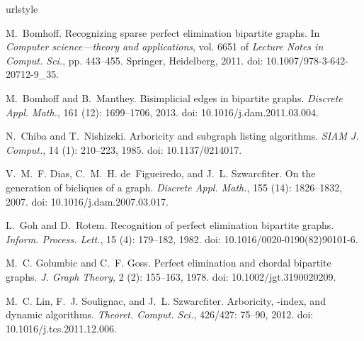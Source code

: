 \documentclass[a4paper,11pt]{article}
\begin{document}
\begin{thebibliography}{14}
\providecommand{\natexlab}[1]{#1}
\providecommand{\url}[1]{\texttt{#1}}
\expandafter\ifx\csname urlstyle\endcsname\relax
  \providecommand{\doi}[1]{doi: #1}\else
  \providecommand{\doi}{doi: \begingroup \urlstyle{rm}\Url}\fi

M.~Bomhoff.
\newblock Recognizing sparse perfect elimination bipartite graphs.
\newblock In \emph{Computer science---theory and applications}, vol. 6651 of
  \emph{Lecture Notes in Comput. Sci.}, pp. 443--455. Springer, Heidelberg,
  2011.
\newblock \doi{10.1007/978-3-642-20712-9_35}.

M.~Bomhoff and B.~Manthey.
\newblock Bisimplicial edges in bipartite graphs.
\newblock \emph{Discrete Appl. Math.}, 161 (12): 1699--1706,
  2013.
\newblock \doi{10.1016/j.dam.2011.03.004}.

N.~Chiba and T.~Nishizeki.
\newblock Arboricity and subgraph listing algorithms.
\newblock \emph{SIAM J. Comput.}, 14 (1): 210--223, 1985.
\newblock \doi{10.1137/0214017}.

V.~M.~F. Dias, C.~M.~H. de~Figueiredo, and J.~L. Szwarcfiter.
\newblock On the generation of bicliques of a graph.
\newblock \emph{Discrete Appl. Math.}, 155 (14): 1826--1832,
  2007.
\newblock \doi{10.1016/j.dam.2007.03.017}.

L.~Goh and D.~Rotem.
\newblock Recognition of perfect elimination bipartite graphs.
\newblock \emph{Inform. Process. Lett.}, 15 (4): 179--182,
  1982.
\newblock \doi{10.1016/0020-0190(82)90101-6}.

M.~C. Golumbic and C.~F. Goss.
\newblock Perfect elimination and chordal bipartite graphs.
\newblock \emph{J. Graph Theory}, 2 (2): 155--163, 1978.
\newblock \doi{10.1002/jgt.3190020209}.

M.~C. Lin, F.~J. Soulignac, and J.~L. Szwarcfiter.
\newblock Arboricity, {}-index, and dynamic algorithms.
\newblock \emph{Theoret. Comput. Sci.}, 426/427: 75--90, 2012.
\newblock \doi{10.1016/j.tcs.2011.12.006}.


\end{thebibliography}
\end{document}
